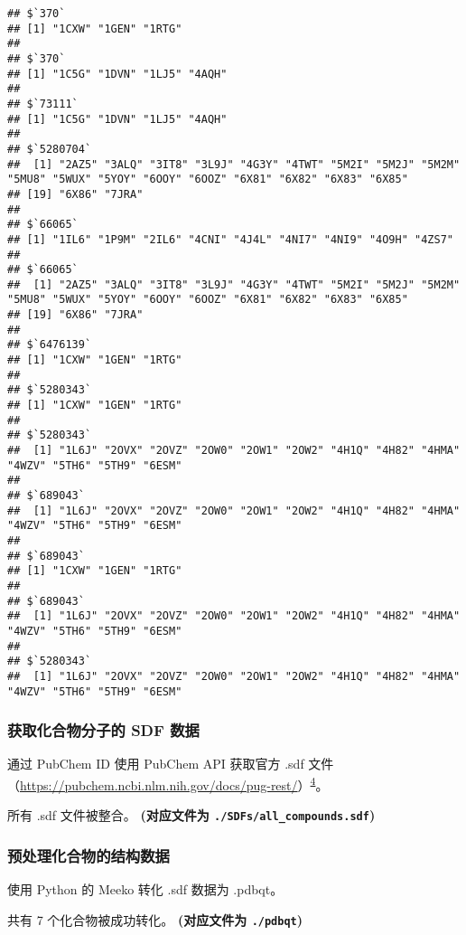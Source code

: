 \documentclass[
]{article}
\begin{document}
\begin{verbatim}
## $`370`
## [1] "1CXW" "1GEN" "1RTG"
## 
## $`370`
## [1] "1C5G" "1DVN" "1LJ5" "4AQH"
## 
## $`73111`
## [1] "1C5G" "1DVN" "1LJ5" "4AQH"
## 
## $`5280704`
##  [1] "2AZ5" "3ALQ" "3IT8" "3L9J" "4G3Y" "4TWT" "5M2I" "5M2J" "5M2M" "5MU8" "5WUX" "5YOY" "6OOY" "6OOZ" "6X81" "6X82" "6X83" "6X85"
## [19] "6X86" "7JRA"
## 
## $`66065`
## [1] "1IL6" "1P9M" "2IL6" "4CNI" "4J4L" "4NI7" "4NI9" "4O9H" "4ZS7"
## 
## $`66065`
##  [1] "2AZ5" "3ALQ" "3IT8" "3L9J" "4G3Y" "4TWT" "5M2I" "5M2J" "5M2M" "5MU8" "5WUX" "5YOY" "6OOY" "6OOZ" "6X81" "6X82" "6X83" "6X85"
## [19] "6X86" "7JRA"
## 
## $`6476139`
## [1] "1CXW" "1GEN" "1RTG"
## 
## $`5280343`
## [1] "1CXW" "1GEN" "1RTG"
## 
## $`5280343`
##  [1] "1L6J" "2OVX" "2OVZ" "2OW0" "2OW1" "2OW2" "4H1Q" "4H82" "4HMA" "4WZV" "5TH6" "5TH9" "6ESM"
## 
## $`689043`
##  [1] "1L6J" "2OVX" "2OVZ" "2OW0" "2OW1" "2OW2" "4H1Q" "4H82" "4HMA" "4WZV" "5TH6" "5TH9" "6ESM"
## 
## $`689043`
## [1] "1CXW" "1GEN" "1RTG"
## 
## $`689043`
##  [1] "1L6J" "2OVX" "2OVZ" "2OW0" "2OW1" "2OW2" "4H1Q" "4H82" "4HMA" "4WZV" "5TH6" "5TH9" "6ESM"
## 
## $`5280343`
##  [1] "1L6J" "2OVX" "2OVZ" "2OW0" "2OW1" "2OW2" "4H1Q" "4H82" "4HMA" "4WZV" "5TH6" "5TH9" "6ESM"
\end{verbatim}

\hypertarget{ux83b7ux53d6ux5316ux5408ux7269ux5206ux5b50ux7684-sdf-ux6570ux636e}{%
\subsubsection{获取化合物分子的 SDF 数据}\label{ux83b7ux53d6ux5316ux5408ux7269ux5206ux5b50ux7684-sdf-ux6570ux636e}}

通过 PubChem ID 使用 PubChem API 获取官方 .sdf 文件（\url{https://pubchem.ncbi.nlm.nih.gov/docs/pug-rest/}）\textsuperscript{\protect\hyperlink{ref-AnUpdateOnPuKimS2018}{4}}。

所有 .sdf 文件被整合。
\textbf{(对应文件为 \texttt{./SDFs/all\_compounds.sdf})}

\hypertarget{ux9884ux5904ux7406ux5316ux5408ux7269ux7684ux7ed3ux6784ux6570ux636e}{%
\subsubsection{预处理化合物的结构数据}\label{ux9884ux5904ux7406ux5316ux5408ux7269ux7684ux7ed3ux6784ux6570ux636e}}

使用 Python 的 Meeko 转化 .sdf 数据为 .pdbqt。

共有 7 个化合物被成功转化。
\textbf{(对应文件为 \texttt{./pdbqt})}
\end{document}
